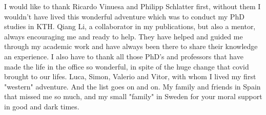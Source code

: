 \begin{acknowledgements}
I would like to thank Ricardo Vinuesa and Philipp Schlatter first, without them I wouldn't have lived this wonderful adventure
which was to conduct my PhD studies in KTH. 
Qiang Li, a collaborator in my publications, but also a mentor, always encouraging me and ready to help. They have helped and guided me through my academic work and have always been there to share their knowledge an experience.
I also have to thank all those PhD's and professors that have made the life in the office so wonderful, in spite of the huge change that covid brought to our lifes.
Luca, Simon, Valerio and Vitor, with whom I lived my first "western" adventure. And the list goes on and on.
My family and friends in Spain that missed me so much, and my small "family" in Sweden for your moral support in good and dark times.
\end{acknowledgements}
